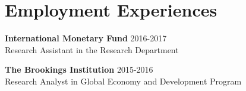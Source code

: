 
\section{Employment Experiences}
\vspace{-0.25in}
\begin{outerlist}
	\item \textbf{International Monetary Fund} \hfill 2016-2017 \\
	Research Assistant in the Research Department
	\item \textbf{The Brookings Institution} \hfill 2015-2016 \\
	Research Analyst in Global Economy and Development Program
\end{outerlist}
